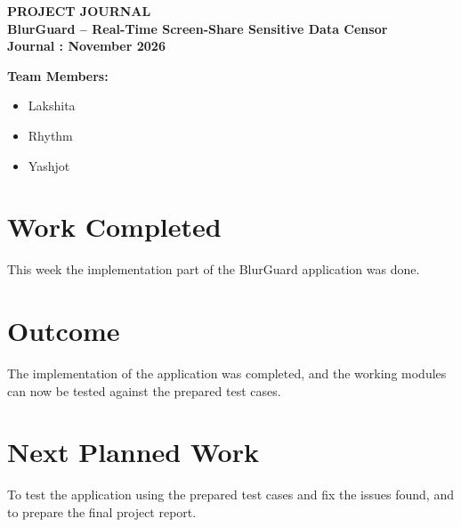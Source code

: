 \documentclass[12pt,a4paper]{article}
\begin{document}
\begin{center}
    {\Large\bfseries PROJECT JOURNAL}\\[10pt]
    {\large\bfseries BlurGuard -- Real-Time Screen-Share Sensitive Data Censor}\\[10pt]
    {\bfseries Journal : November 2026}
\end{center}

\vspace{6pt}

\textbf{Team Members:}
\begin{itemize}[topsep=2pt,itemsep=0pt]
    \item Lakshita
    \item Rhythm
    \item Yashjot
\end{itemize}

\section*{Work Completed}
This week the implementation part of the BlurGuard application was done.

\section*{Outcome}
The implementation of the application was completed, and the working modules can now be tested against the prepared test cases.

\section*{Next Planned Work}
To test the application using the prepared test cases and fix the issues found, and to prepare the final project report.
\end{document}

